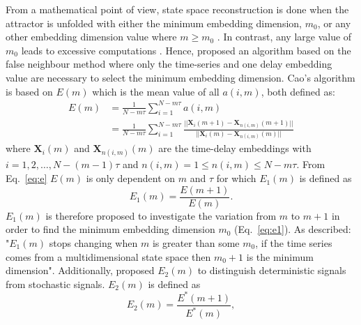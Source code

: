 From a mathematical point of view, state space reconstruction is done when 
the attractor is unfolded with either the minimum embedding dimension, $m_0$, 
or any other embedding dimension value where $m \ge m_0$ \citep{kennel1992}.
In contrast, any large value of $m_0$ leads to excessive computations 
\citep{bradley2015}. Hence, \cite{Cao1997} proposed an algorithm based on the
false neighbour method where only the time-series and one delay embedding value 
are necessary to select the minimum embedding dimension. 
Cao's algorithm is based on $E(m)$  which is the mean value of all $a(i,m)$,
both defined as: 
\begin{equation}\label{eq:e}
  \begin{aligned}
E(m) &= \frac{1}{N-m\tau} \sum_{i=1}^{N-m\tau} a(i,m) \\
    &=
       \frac{1}{N-m\tau} \sum_{i=1}^{N-m\tau}
       \frac{ || \boldsymbol{X}_i(m+1) - \boldsymbol{X}_{n(i,m)}(m+1) || }
            { || \boldsymbol{X}_i(m) - \boldsymbol{X}_{n(i,m)}(m) ||  }
  \end{aligned}
\end{equation}
where $\boldsymbol{X}_i(m)$ and $\boldsymbol{X}_{n(i,m)}(m)$ are the time-delay
embeddings with $i=1,2,\dots,N-(m-1)\tau$ and 
$ n(i,m)= 1 \le n(i,m) \le N-m\tau$.
From Eq.~\ref{eq:e} $E(m)$ is only dependent on $m$ and $\tau$ for which 
$E_1(m)$ is defined as
\begin{equation}\label{eq:e1}
E_1(m) = \frac{ E(m+1) } { E(m)}.
\end{equation}
$E_1(m)$ is therefore proposed to investigate the variation from $m$ to $m+1$
in order to find the minimum embedding dimension $m_0$ (Eq.~\ref{eq:e1}).
As \citealt[p. 44]{Cao1997} described: "$E_1(m)$ stops changing when $m$ is 
greater than some $m_0$, if the time series comes from a multidimensional 
state space then $m_0 + 1$ is the minimum dimension".
Additionally, \cite{Cao1997} proposed $E_2(m)$ to distinguish deterministic 
signals from stochastic signals. $E_2(m)$ is defined as
\begin{equation}\label{eq:e2}
E_2(m) = \frac{ E^* (m+1) } { E^*(m)},
\end{equation}
